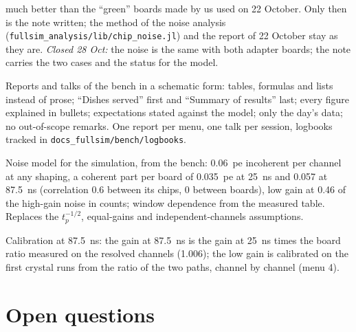 \documentclass[11pt]{article}
\newcommand{\code}[1]{\texttt{#1}}
\begin{document}
\begin{description}
  much better than the ``green'' boards made by us used on 22 October. Only then is the note
  written; the method of the noise analysis (\code{fullsim\_analysis/lib/chip\_noise.jl}) and
  the report of 22 October stay as they are. \emph{Closed 28 Oct:} the noise is the same
  with both adapter boards; the note carries the two cases and the status for the model.
\item[28 Oct 2026] Reports and talks of the bench in a schematic form: tables, formulas and
  lists instead of prose; ``Dishes served'' first and ``Summary of results'' last; every
  figure explained in bullets; expectations stated against the model; only the day's data;
  no out-of-scope remarks. One report per menu, one talk per session, logbooks tracked in
  \code{docs\_fullsim/bench/logbooks}.
\item[28 Oct 2026] Noise model for the simulation, from the bench: 0.06~pe incoherent per
  channel at any shaping, a coherent part per board of 0.035~pe at 25~ns and 0.057 at 87.5~ns
  (correlation 0.6 between its chips, 0 between boards), low gain at 0.46 of the high-gain
  noise in counts; window dependence from the measured table. Replaces the $t_p^{-1/2}$,
  equal-gains and independent-channels assumptions.
\item[28 Oct 2026] Calibration at 87.5~ns: the gain at 87.5~ns is the gain at 25~ns times the
  board ratio measured on the resolved channels (1.006); the low gain is calibrated on the
  first crystal runs from the ratio of the two paths, channel by channel (menu 4).
\end{description}

\section{Open questions}
\end{document}
